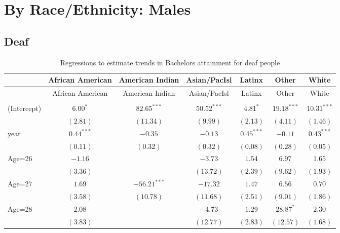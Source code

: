 \documentclass[fullpage]{paper}
\begin{document}
\section{ By Race/Ethnicity: Males }

\subsection{ Deaf }

\begin{center}
\begin{longtable}{l c c c c c c }
\hline
 & African American & American Indian & Asian/PacIsl & Latinx & Other & White \\
\hline
\endfirsthead
\hline
 & African American & American Indian & Asian/PacIsl & Latinx & Other & White \\
\hline
\endhead
\hline
\endfoot
\hline
\multicolumn{7}{l}{\scriptsize{$^{***}p<0.001$, $^{**}p<0.01$, $^*p<0.05$}}\\
\caption{Regressions to estimate trends in Bachelors attainment for deaf people}
\label{table:coefficients}
\endlastfoot
(Intercept) & $6.00^{*}$   & $82.65^{***}$  & $50.52^{***}$ & $4.81^{*}$   & $19.18^{***}$ & $10.31^{***}$ \\
            & $(2.81)$     & $(11.34)$      & $(9.99)$      & $(2.13)$     & $(4.11)$      & $(1.46)$      \\
year        & $0.44^{***}$ & $-0.35$        & $-0.13$       & $0.45^{***}$ & $-0.11$       & $0.43^{***}$  \\
            & $(0.11)$     & $(0.32)$       & $(0.32)$      & $(0.08)$     & $(0.28)$      & $(0.05)$      \\
Age=26      & $-1.16$      &                & $-3.73$       & $1.54$       & $6.97$        & $1.65$        \\
            & $(3.36)$     &                & $(13.72)$     & $(2.39)$     & $(9.62)$      & $(1.93)$      \\
Age=27      & $1.69$       & $-56.21^{***}$ & $-17.32$      & $1.47$       & $6.56$        & $0.70$        \\
            & $(3.58)$     & $(10.78)$      & $(11.68)$     & $(2.51)$     & $(9.01)$      & $(1.86)$      \\
Age=28      & $2.08$       &                & $-4.73$       & $1.29$       & $28.87^{*}$   & $2.30$        \\
            & $(3.83)$     &                & $(12.77)$     & $(2.83)$     & $(12.57)$     & $(1.68)$      \\

\end{longtable}
\end{center}
\end{document}
